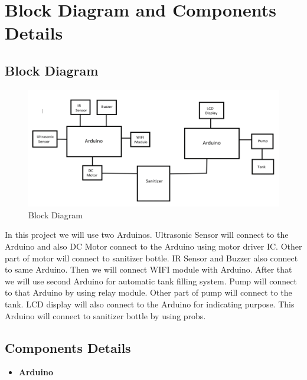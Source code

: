 


\chapter{Block Diagram and Components Details}

\section{Block Diagram}

	\begin{figure}[h]
		\centering
	\includegraphics[width=140mm,scale=1]{50}
	\caption{Block Diagram}
	\label{Block Diagram}
	\end{figure}

    In this project we will use two Arduinos. Ultrasonic Sensor will connect to the Arduino and also DC Motor connect to the Arduino using motor driver IC. Other part of motor will connect to sanitizer bottle. IR Sensor and Buzzer also connect to same Arduino. Then we will connect WIFI module with Arduino.
	After that we will use second Arduino for automatic tank filling system. Pump will connect to that Arduino by using relay module. Other part of pump will connect to the tank. LCD display will also connect to the Arduino for indicating purpose. This Arduino will connect to sanitizer bottle by using probs.


\section{Components Details}
 \begin{itemize}
 	\item \Large\textbf {Arduino}
\end{itemize}
 
